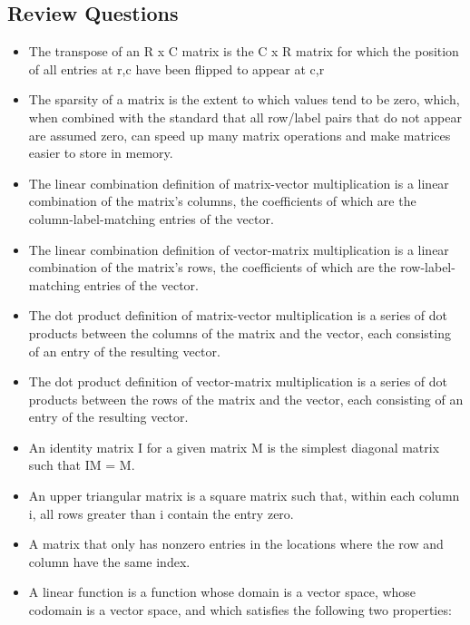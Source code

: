 \documentclass{article}
\begin{document}
    \subsection{Review Questions}
    \begin{itemize}
        \item The transpose of an R x C matrix is the C x R matrix for which the position of all entries at r,c have been flipped to appear at c,r
        \item The sparsity of a matrix is the extent to which values tend to be
            zero, which, when combined with the standard that all row/label
            pairs that do not appear are assumed zero, can speed up many matrix
            operations and make matrices easier to store in memory.
        \item The linear combination definition of matrix-vector multiplication
            is a linear combination of the matrix's columns, the coefficients
            of which are the column-label-matching entries of the vector.
        \item The linear combination definition of vector-matrix multiplication
            is a linear combination of the matrix's rows, the coefficients of
            which are the row-label-matching entries of the vector.
        \item The dot product definition of matrix-vector multiplication
            is a series of dot products between the columns of the matrix and
            the vector, each consisting of an entry of the resulting vector.
        \item The dot product definition of vector-matrix multiplication
            is a series of dot products between the rows of the matrix and the
            vector, each consisting of an entry of the resulting vector.
        \item An identity matrix I for a given matrix M is the simplest
            diagonal matrix such that IM = M.
        \item An upper triangular matrix is a square matrix such that, within each column i,
            all rows greater than i contain the entry zero. 
        \item A matrix that only has nonzero entries in the locations where the row and column 
            have the same index.
        \item A linear function is a function whose domain is a vector space, whose codomain is
            a vector space, and which satisfies the following two properties:
            \begin{enumerate}

\end{enumerate}
\end{itemize}
\end{document}
